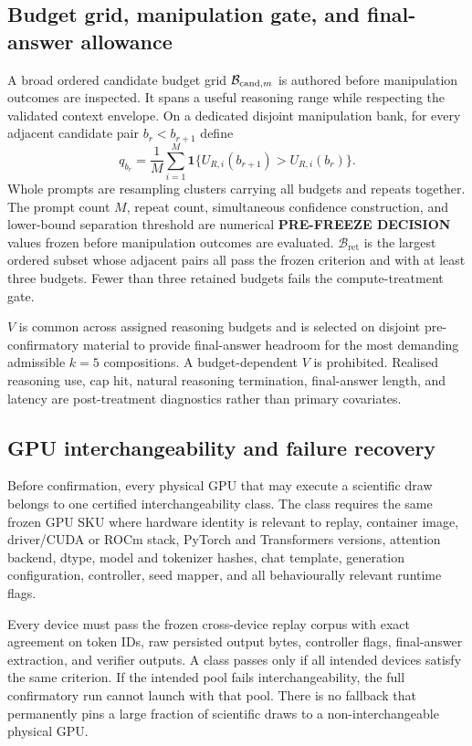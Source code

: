 \documentclass[11pt,a4paper]{article}
\newcommand{\PFD}{\textbf{PRE-FREEZE DECISION}}
\newcommand{\Bret}{\mathcal B_{\mathrm{ret}}}
\begin{document}
\subsection{Budget grid, manipulation gate, and final-answer allowance}
A broad ordered candidate budget grid $\mathcal B_{{\rm cand},m}$ is authored before manipulation outcomes are inspected. It spans a useful reasoning range while respecting the validated context envelope. On a dedicated disjoint manipulation bank, for every adjacent candidate pair $b_r<b_{r+1}$ define
\[
q_{b_r}=\frac1M\sum_{i=1}^{M}\mathbf 1\{U_{R,i}(b_{r+1})>U_{R,i}(b_r)\}.
\]
Whole prompts are resampling clusters carrying all budgets and repeats together. The prompt count $M$, repeat count, simultaneous confidence construction, and lower-bound separation threshold are numerical \PFD{} values frozen before manipulation outcomes are evaluated. $\Bret$ is the largest ordered subset whose adjacent pairs all pass the frozen criterion and with at least three budgets. Fewer than three retained budgets fails the compute-treatment gate.

$V$ is common across assigned reasoning budgets and is selected on disjoint pre-confirmatory material to provide final-answer headroom for the most demanding admissible $k=5$ compositions. A budget-dependent $V$ is prohibited. Realised reasoning use, cap hit, natural reasoning termination, final-answer length, and latency are post-treatment diagnostics rather than primary covariates.

\subsection{GPU interchangeability and failure recovery}\label{sec:interchange}
Before confirmation, every physical GPU that may execute a scientific draw belongs to one certified interchangeability class. The class requires the same frozen GPU SKU where hardware identity is relevant to replay, container image, driver/CUDA or ROCm stack, PyTorch and Transformers versions, attention backend, dtype, model and tokenizer hashes, chat template, generation configuration, controller, seed mapper, and all behaviourally relevant runtime flags.

Every device must pass the frozen cross-device replay corpus with exact agreement on token IDs, raw persisted output bytes, controller flags, final-answer extraction, and verifier outputs. A class passes only if all intended devices satisfy the same criterion. If the intended pool fails interchangeability, the full confirmatory run cannot launch with that pool. There is no fallback that permanently pins a large fraction of scientific draws to a non-interchangeable physical GPU.
\end{document}
